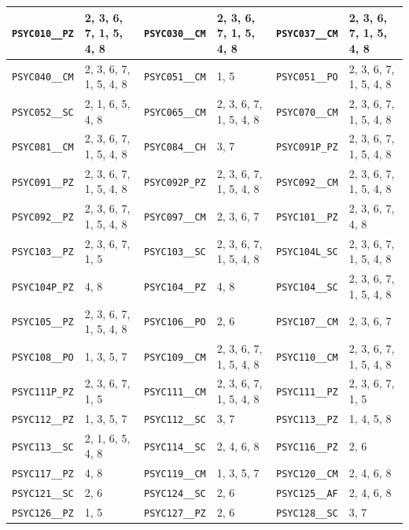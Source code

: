 \begin{longtable}{|l|l||l|l||l|l|}
    \verb|PSYC010__PZ| & 2, 3, 6, 7, 1, 5, 4, 8 & \verb|PSYC030__CM| & 2, 3, 6, 7, 1, 5, 4, 8 & \verb|PSYC037__CM| & 2, 3, 6, 7, 1, 5, 4, 8\\\hline
    \verb|PSYC040__CM| & 2, 3, 6, 7, 1, 5, 4, 8 & \verb|PSYC051__CM| & 1, 5 & \verb|PSYC051__PO| & 2, 3, 6, 7, 1, 5, 4, 8\\\hline
    \verb|PSYC052__SC| & 2, 1, 6, 5, 4, 8 & \verb|PSYC065__CM| & 2, 3, 6, 7, 1, 5, 4, 8 & \verb|PSYC070__CM| & 2, 3, 6, 7, 1, 5, 4, 8\\\hline
    \verb|PSYC081__CM| & 2, 3, 6, 7, 1, 5, 4, 8 & \verb|PSYC084__CH| & 3, 7 & \verb|PSYC091P_PZ| & 2, 3, 6, 7, 1, 5, 4, 8\\\hline
    \verb|PSYC091__PZ| & 2, 3, 6, 7, 1, 5, 4, 8 & \verb|PSYC092P_PZ| & 2, 3, 6, 7, 1, 5, 4, 8 & \verb|PSYC092__CM| & 2, 3, 6, 7, 1, 5, 4, 8\\\hline
    \verb|PSYC092__PZ| & 2, 3, 6, 7, 1, 5, 4, 8 & \verb|PSYC097__CM| & 2, 3, 6, 7 & \verb|PSYC101__PZ| & 2, 3, 6, 7, 4, 8\\\hline
    \verb|PSYC103__PZ| & 2, 3, 6, 7, 1, 5 & \verb|PSYC103__SC| & 2, 3, 6, 7, 1, 5, 4, 8 & \verb|PSYC104L_SC| & 2, 3, 6, 7, 1, 5, 4, 8\\\hline
    \verb|PSYC104P_PZ| & 4, 8 & \verb|PSYC104__PZ| & 4, 8 & \verb|PSYC104__SC| & 2, 3, 6, 7, 1, 5, 4, 8\\\hline
    \verb|PSYC105__PZ| & 2, 3, 6, 7, 1, 5, 4, 8 & \verb|PSYC106__PO| & 2, 6 & \verb|PSYC107__CM| & 2, 3, 6, 7\\\hline
    \verb|PSYC108__PO| & 1, 3, 5, 7 & \verb|PSYC109__CM| & 2, 3, 6, 7, 1, 5, 4, 8 & \verb|PSYC110__CM| & 2, 3, 6, 7, 1, 5, 4, 8\\\hline
    \verb|PSYC111P_PZ| & 2, 3, 6, 7, 1, 5 & \verb|PSYC111__CM| & 2, 3, 6, 7, 1, 5, 4, 8 & \verb|PSYC111__PZ| & 2, 3, 6, 7, 1, 5\\\hline
    \verb|PSYC112__PZ| & 1, 3, 5, 7 & \verb|PSYC112__SC| & 3, 7 & \verb|PSYC113__PZ| & 1, 4, 5, 8\\\hline
    \verb|PSYC113__SC| & 2, 1, 6, 5, 4, 8 & \verb|PSYC114__SC| & 2, 4, 6, 8 & \verb|PSYC116__PZ| & 2, 6\\\hline
    \verb|PSYC117__PZ| & 4, 8 & \verb|PSYC119__CM| & 1, 3, 5, 7 & \verb|PSYC120__CM| & 2, 4, 6, 8\\\hline
    \verb|PSYC121__SC| & 2, 6 & \verb|PSYC124__SC| & 2, 6 & \verb|PSYC125__AF| & 2, 4, 6, 8\\\hline
    \verb|PSYC126__PZ| & 1, 5 & \verb|PSYC127__PZ| & 2, 6 & \verb|PSYC128__SC| & 3, 7\\\hline

\end{longtable}
